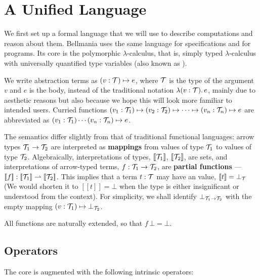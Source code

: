 \section{A Unified Language}

\newcommand\semp[1]{[\![{#1}]\!]}
\newcommand\fix{\operatorname{fix}}

We first set up a formal language that we will use to describe computations and reason about them.
Bellmania uses the same language for specifications and for programs.  Its core is the polymorphic
$\lambda$-calculus, that is, simply typed $\lambda$-calculus with universally quantified type variables 
(also known as ).

We write abstraction terms as $(v:\mathcal{T})\mapsto e$, where $\mathcal{T}$ is the type of the argument $v$ and $e$ is
the body, instead of the traditional notation $\lambda(v:\mathcal{T}).\,e$, mainly due to aesthetic reasons
but also because we hope this will look more familiar to intended users.
Curried functions $(v_1:\mathcal{T}_1)\mapsto (v_2:\mathcal{T}_2) \mapsto \cdots \mapsto (v_n:\mathcal{T}_n) \mapsto e$ are abbreviated 
as $(v_1:\mathcal{T}_1)\cdots(v_n:\mathcal{T}_n)\mapsto e$.

The semantics differ slightly from that of traditional functional languages: arrow types $\mathcal{T}_1\to\mathcal{T}_2$
are interpreted as {\bf mappings} from values of type $\mathcal{T}_1$ to values of type $\mathcal{T}_2$. Algebraically,
interpretations of types, $\semp{\T_1}$, $\semp{\T_2}$, are sets, and interpretations of arrow-typed terms,
$f : \mathcal{T}_1\to\mathcal{T}_2$, are {\bf partial functions} --- $\semp{f} : \semp{\T_1}\rightharpoonup\semp{\T_2}$.
This implies that a term $t : \mathcal{T}$ may have an  value, $\semp{t}=\bot_\T$
(We would shorten it to $\semp{t}=\bot$ when the type is either insignificant or understood from the context).
For simplicity, we shall identify $\bot_{\mathcal{T}_1\to\mathcal{T}_2}$ with the empty mapping $(v:\mathcal{T}_1)\mapsto\bot_{\mathcal{T}_2}$.

All functions are naturally extended, so that $f\,\bot=\bot$.

\subsection{Operators}
\label{lang:operators}

The core is augmented with the following intrinsic operators:

